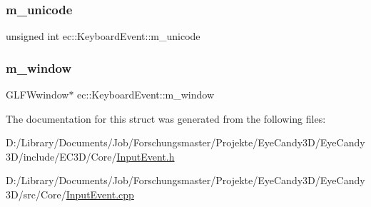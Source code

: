 \subsubsection{\texorpdfstring{m\+\_\+unicode}{m\_unicode}}
{\footnotesize\ttfamily unsigned int ec\+::\+Keyboard\+Event\+::m\+\_\+unicode}

\mbox{\label{structec_1_1_keyboard_event_a6de06c21e83612aeca727beedd93ae82}} 
\subsubsection{\texorpdfstring{m\+\_\+window}{m\_window}}
{\footnotesize\ttfamily G\+L\+F\+Wwindow$\ast$ ec\+::\+Keyboard\+Event\+::m\+\_\+window}



The documentation for this struct was generated from the following files\+:\begin{DoxyCompactItemize}
\item 
D\+:/\+Library/\+Documents/\+Job/\+Forschungsmaster/\+Projekte/\+Eye\+Candy3\+D/\+Eye\+Candy3\+D/include/\+E\+C3\+D/\+Core/\mbox{\hyperlink{_input_event_8h}{Input\+Event.\+h}}\item 
D\+:/\+Library/\+Documents/\+Job/\+Forschungsmaster/\+Projekte/\+Eye\+Candy3\+D/\+Eye\+Candy3\+D/src/\+Core/\mbox{\hyperlink{_input_event_8cpp}{Input\+Event.\+cpp}}\end{DoxyCompactItemize}
